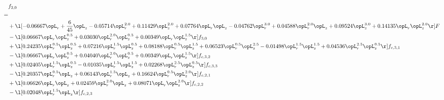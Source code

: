 \begin{alignat}{2} 
\label{eq:f_20_2} 
& f_{2,0} \nonumber \\ 
 = \\ 
& + \l[  -0.06667 \opL_r + \frac{6}{45} \opL_z   -0.05714 \opL_r^{2.0} +  0.11429 \opL_z^{2.0} +  0.07764 \opL_r \opL_z   -0.04762 \opL_r^{3.0} +  0.04588 \opL_r^{2.0} \opL_z +  0.09524 \opL_z^{3.0} +  0.14135 \opL_r \opL_z^{2.0}  \r] F \nonumber \\ 
& - \l[  0.06667 \opL_r \opL_z^{0.5} +  0.03030 \opL_r^{2.0} \opL_z^{0.5} +  0.00349 \opL_r \opL_z^{1.5}  \r] f_{3,0} \nonumber \\ 
& + \l[  0.24235 \opL_r^{0.5} \opL_z^{0.5} +  0.07216 \opL_r^{1.5} \opL_z^{0.5} +  0.08188 \opL_r^{0.5} \opL_z^{1.5} +  0.06523 \opL_r^{0.5} \opL_z^{2.5}   -0.01498 \opL_r^{1.5} \opL_z^{1.5} +  0.04536 \opL_r^{2.5} \opL_z^{0.5}  \r] f_{c,3,1} \nonumber \\ 
& - \l[  0.06667 \opL_r \opL_z^{0.5} +  0.04040 \opL_r^{2.0} \opL_z^{0.5} +  0.00349 \opL_r \opL_z^{1.5}  \r] f_{c,3,2} \nonumber \\ 
& + \l[  0.02405 \opL_r^{1.5} \opL_z^{0.5}   -0.01035 \opL_r^{1.5} \opL_z^{1.5} +  0.02268 \opL_r^{2.5} \opL_z^{0.5}  \r] f_{c,3,3} \nonumber \\ 
& - \l[  0.20357 \opL_r^{0.5} \opL_z +  0.06143 \opL_r^{1.5} \opL_z +  0.16624 \opL_r^{0.5} \opL_z^{2.0}  \r] f_{c,2,1} \nonumber \\ 
& + \l[  0.06626 \opL_r \opL_z +  0.02459 \opL_r^{2.0} \opL_z +  0.08071 \opL_r \opL_z^{2.0}  \r] f_{c,2,2} \nonumber \\ 
& - \l[  0.02048 \opL_r^{1.5} \opL_z  \r] f_{c,2,3} \nonumber \\ 
\end{alignat} 


